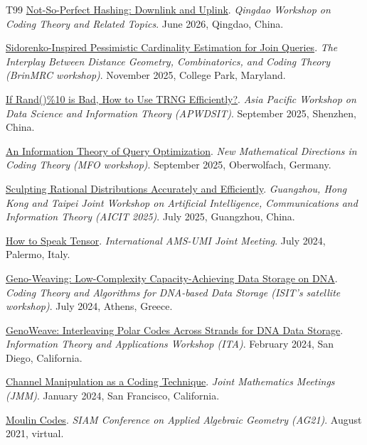 \documentclass{article}
\def\sec#1{\vskip1em\textbf{\fs1#1}}
\def\fs#1{%
        \pgfmathsetmacro\a{#1}%
        \pgfmathsetmacro\A{\parskip*(4/3)^\a}%
        \pgfmathsetmacro\B{\A*(4/3)}%
        \fontsize{\A pt}{\B pt}\selectfont%
    }
\begin{document}
\bgroup
\def\section#1#2{\sec{Invited Talks \mdseries (new to old)}}
\begin{thebibliography}{T99}
    \href{https://husihuang.github.io/workshop.html}
    {Not-So-Perfect Hashing: Downlink and Uplink}.
    \emph{Qingdao Workshop on Coding Theory and Related Topics}.
    June 2026, Qingdao, China.

    \href{https://brinmrc.umd.edu/fall25-ibdgcct/}
    {Sidorenko-Inspired Pessimistic Cardinality Estimation for Join Queries}.
    \emph{The Interplay Between Distance Geometry, Combinatorics, and Coding Theory (BrinMRC workshop)}.
    November 2025, College Park, Maryland.

    \href{https://www.apwdsit.org/Program}
    {If Rand()\%10 is Bad, How to Use TRNG Efficiently?}.
    \emph{Asia Pacific Workshop on Data Science and Information Theory (APWDSIT)}.
    September 2025, Shenzhen, China.

    \href{https://www.mfo.de/www/activity/2537}
    {An Information Theory of Query Optimization}.
    \emph{New Mathematical Directions in Coding Theory (MFO workshop)}.
    September 2025, Oberwolfach, Germany.

    \href{https://aicit2025.github.io/Program/}
    {Sculpting Rational Distributions Accurately and Efficiently}.
    \emph{Guangzhou, Hong Kong and Taipei Joint Workshop on Artificial Intelligence, Communications and Information Theory (AICIT 2025)}.
    July 2025, Guangzhou, China.

    \href{https://umi.dm.unibo.it/jm-umi-ams/special-sessions/special-sessions-on-25-26-july-2024/}
    {How to Speak Tensor}.
    \emph{International AMS-UMI Joint Meeting}.
    July 2024, Palermo, Italy.

    \href{https://www.ce.cit.tum.de/en/lnt/events/2024-coding-theory-and-algorithms-for-dna-based-data-storage/program/}
    {Geno-Weaving: Low-Complexity Capacity-Achieving Data Storage on DNA}.
    \emph{Coding Theory and Algorithms for DNA-based Data Storage (ISIT's satellite workshop)}.
    July 2024, Athens, Greece.

    \href{https://ita.ucsd.edu/workshop/schedule}
    {GenoWeave: Interleaving Polar Codes Across Strands for DNA Data Storage}.
    \emph{Information Theory and Applications Workshop (ITA)}.
    February 2024, San Diego, California.

    \href{https://meetings.ams.org/math/jmm2024/meetingapp.cgi/Paper/29146}
    {Channel Manipulation as a Coding Technique}.
    \emph{Joint Mathematics Meetings (JMM)}.
    January 2024, San Francisco, California.

    \href{https://meetings.siam.org/sess/dsp_talk.cfm?p=116047}
    {Moulin Codes}.
    \emph{SIAM Conference on Applied Algebraic Geometry (AG21)}.
    August 2021, virtual.
\end{thebibliography}
\egroup
\end{document}

